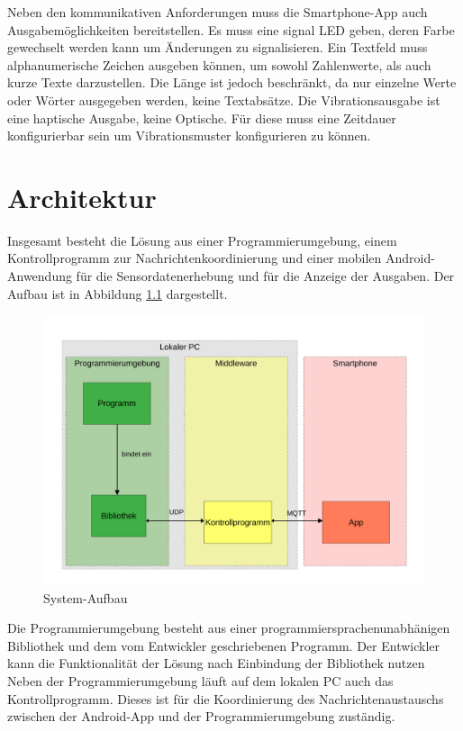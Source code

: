 \documentclass[11pt,a4paper]{report}
\begin{document}
Neben den kommunikativen Anforderungen muss die Smartphone-App auch Ausgabemöglichkeiten bereitstellen.
Es muss eine signal LED geben, deren Farbe gewechselt werden kann um Änderungen zu signalisieren.
Ein Textfeld muss alphanumerische Zeichen ausgeben können, um sowohl Zahlenwerte, als auch kurze Texte darzustellen.
Die Länge ist jedoch beschränkt, da nur einzelne Werte oder Wörter ausgegeben werden, keine Textabsätze.
Die Vibrationsausgabe ist eine haptische Ausgabe, keine Optische.
Für diese muss eine Zeitdauer konfigurierbar sein um Vibrationsmuster konfigurieren zu können.
\chapter{Architektur} \label{chap:architektur}
Insgesamt besteht die Lösung aus einer Programmierumgebung, einem Kontrollprogramm zur Nachrichtenkoordinierung und einer mobilen Android-Anwendung für die Sensordatenerhebung und für die Anzeige der Ausgaben.
Der Aufbau ist in Abbildung \ref{fig:design} dargestellt.
\begin{figure}[htbp]
\centering
\includegraphics[width=\textwidth]{images/framework.pdf}
\caption{System-Aufbau}
\label{fig:design}
\end{figure}
Die Programmierumgebung besteht aus einer programmiersprachenunabhänigen Bibliothek und dem vom Entwickler geschriebenen Programm.
Der Entwickler kann die Funktionalität der Lösung nach Einbindung der Bibliothek nutzen
Neben der Programmierumgebung läuft auf dem lokalen PC auch das Kontrollprogramm.
Dieses ist für die Koordinierung des Nachrichtenaustauschs zwischen der Android-App und der Programmierumgebung zuständig.
\end{document}
